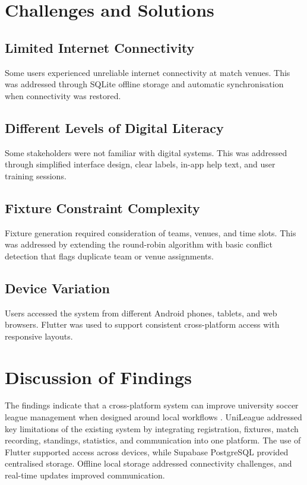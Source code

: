 \documentclass[12pt,a4paper]{report}
\begin{document}
\section{Challenges and Solutions}
\subsection{Limited Internet Connectivity}
Some users experienced unreliable internet connectivity at match venues. This was addressed
through SQLite offline storage and automatic synchronisation when connectivity was restored.

\subsection{Different Levels of Digital Literacy}
Some stakeholders were not familiar with digital systems. This was addressed through simplified
interface design, clear labels, in-app help text, and user training sessions.

\subsection{Fixture Constraint Complexity}
Fixture generation required consideration of teams, venues, and time slots. This was addressed
by extending the round-robin algorithm with basic conflict detection that flags duplicate team
or venue assignments.

\subsection{Device Variation}
Users accessed the system from different Android phones, tablets, and web browsers. Flutter
was used to support consistent cross-platform access with responsive layouts.

\section{Discussion of Findings}
The findings indicate that a cross-platform system can improve university soccer league
management when designed around local workflows \cite{sarlak2024}. UniLeague addressed key
limitations of the existing system by integrating registration, fixtures, match recording,
standings, statistics, and communication into one platform. The use of Flutter supported
access across devices, while Supabase PostgreSQL provided centralised storage. Offline local
storage addressed connectivity challenges, and real-time updates improved communication.
\end{document}
